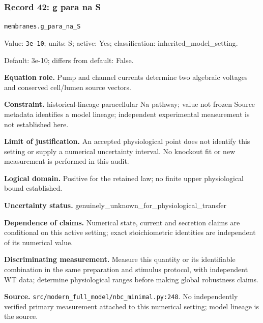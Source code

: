 \subsubsection*{Record 42: g para na S}
{\small \nolinkurl{membranes.g_para_na_S}\par

Value: \texttt{3e-10}; units: S; active: Yes; classification: inherited\_model\_setting.\par

Default: 3e-10; differs from default: False.\par

\textbf{Equation role.} Pump and channel currents determine two algebraic voltages and conserved cell/lumen source vectors.\par

\textbf{Constraint.} historical-lineage paracellular Na pathway; value not frozen Source metadata identifies a model lineage; independent experimental measurement is not established here.\par

\textbf{Limit of justification.} An accepted physiological point does not identify this setting or supply a numerical uncertainty interval. No knockout fit or new measurement is performed in this audit.\par

\textbf{Logical domain.} Positive for the retained law; no finite upper physiological bound established.\par

\textbf{Uncertainty status.} genuinely\_unknown\_for\_physiological\_transfer\par

\textbf{Dependence of claims.} Numerical state, current and secretion claims are conditional on this active setting; exact stoichiometric identities are independent of its numerical value.\par

\textbf{Discriminating measurement.} Measure this quantity or its identifiable combination in the same preparation and stimulus protocol, with independent WT data; determine physiological ranges before making global robustness claims.\par

\textbf{Source.} \nolinkurl{src/modern_full_model/nbc_minimal.py:248}. No independently verified primary measurement attached to this numerical setting; model lineage is the source.\par}

